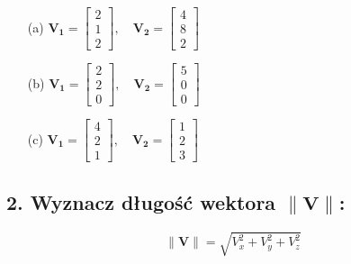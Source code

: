 \begin{enumerate}
    \item[(a)] $\mathbf{V_1} = \begin{bmatrix} 2 \\ 1 \\ 2 \end{bmatrix}, \quad
    \mathbf{V_2} = \begin{bmatrix} 4 \\ 8 \\ 2 \end{bmatrix}$
    
    \item[(b)] $\mathbf{V_1} = \begin{bmatrix} 2 \\ 2 \\ 0 \end{bmatrix}, \quad
    \mathbf{V_2} = \begin{bmatrix} 5 \\ 0 \\ 0 \end{bmatrix}$
    
    \item[(c)] $\mathbf{V_1} = \begin{bmatrix} 4 \\ 2 \\ 1 \end{bmatrix}, \quad
    \mathbf{V_2} = \begin{bmatrix} 1 \\ 2 \\ 3 \end{bmatrix}$
\end{enumerate}

\subsection*{2. Wyznacz długość wektora $\|\mathbf{V}\|$:}

\[
\|\mathbf{V}\| = \sqrt{V_x^2 + V_y^2 + V_z^2}
\]

